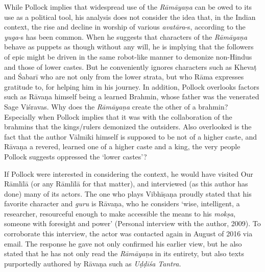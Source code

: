 While Pollock implies that widespread use of the \textit{Rāmāyaṇa} can be owed to its use as a political tool, his analysis does not consider the idea that, in the Indian context, the rise and decline in worship of various \textit{avatāra}-s, according to the \textit{yuga}-s has been common. When he suggests that characters of the \textit{Rāmāyaṇa} behave as puppets as though without any will, he is implying that the followers of epic might be driven in the same robot-like manner to demonize non-Hindus and those of lower castes. But he conveniently ignores characters such as Khevaṭ and Śabarī who are not only from the lower strata, but who Rāma expresses gratitude to, for helping him in his journey. In addition, Pollock overlooks factors such as Rāvaṇa himself being a learned Brahmin, whose father was the venerated Sage Viśravas. Why does the \textit{Rāmāyaṇa} create the other of a brahmin? Especially when Pollock implies that it was with the collaboration of the brahmins that the kings/rulers demonized the outsiders. Also overlooked is the fact that the author Vālmīki himself is supposed to be not of a higher caste, and Rāvaṇa a revered, learned one of a higher caste and a king, the very people Pollock suggests oppressed the ‘lower castes’?

If Pollock were interested in considering the context, he would have visited Our Rāmlīlā (or any Rāmlīlā for that matter), and interviewed (as this author has done) many of its actors. The one who plays Vibhīṣaṇa proudly stated that his favorite character and \textit{guru} is Rāvaṇa, who he considers ‘wise, intelligent, a researcher, resourceful enough to make accessible the means to his \textit{mokṣa}, someone with foresight and power’ (Personal interview with the author, 2009). To corroborate this interview, the actor was contacted again in August of 2016 via email. The response he gave not only confirmed his earlier view, but he also stated that he has not only read the \textit{Rāmāyaṇa} in its entirety, but also texts purportedly authored by Rāvaṇa such as \textit{Uḍḍīśa Tantra.}

